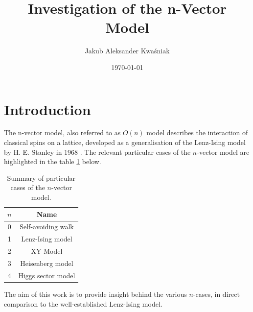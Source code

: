 \documentclass[]{article}
\title{\textbf{Investigation of the n-Vector Model}}
\author{Jakub Aleksander Kwaśniak}
\date{\today}
\numberwithin{equation}{section}
\theoremstyle{break}
\begin{document}
\maketitle
\section{Introduction}
The n-vector model, also referred to as $O(n)$  model describes the interaction of classical spins on a lattice, developed as a generalisation of the Lenz-Ising model by H. E. Stanley in 1968 \cite{stanley-1968}. The relevant particular cases of the $n$-vector model are highlighted in the table \ref{tab:table} below.

\begin{table}[H]
    \centering
    \begin{tabular}{|c|c|}
         \hline  \boldmath $n$ \unboldmath &  \textbf{Name}\\ \hline 
         0 & Self-avoiding walk \\ \hline 
         1 &  Lenz-Ising model \\ \hline 
         2 &  XY Model \\ \hline 
         3 &  Heisenberg model \\ \hline 
         4 & Higgs sector model \\ \hline
    \end{tabular}
    \caption{Summary of particular cases of the $n$-vector model.}
    \label{tab:table}
\end{table}
The aim of this work is to provide insight behind the various $n$-cases, in direct comparison to the well-established Lenz-Ising model.
\end{document}
